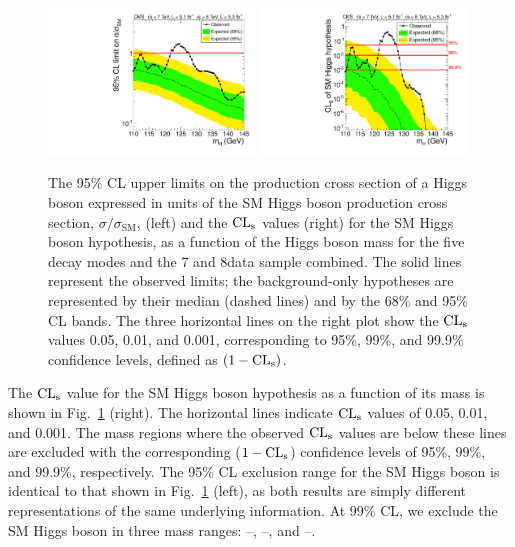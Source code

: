 \documentclass[12pt,twoside,a4paper,cmspaper,final,collab]{cms-tdr}
\begin{document}
\begin{figure} [b]
\centering
\includegraphics[width=0.49\textwidth]{figures/comb/sqr_acls_comb_HPA_smallGGScale} \hfill
\includegraphics[width=0.49\textwidth]{figures/comb/sqr_smacls_comb_HPA_smallGGScale}
\caption{ The 95\% CL upper limits on
the production cross section of a Higgs boson
expressed in units of the SM Higgs boson production cross section,
$\sigma / \sigma_\text{SM}$, (left)
and the $\mathrm{CL_s}$ values (right) for the SM Higgs boson hypothesis,
as a function of the Higgs boson mass for the five decay modes and the 7 and 8\TeV data sample combined.
The solid lines represent the observed limits;
the background-only hypotheses are represented by their median
(dashed lines) and by the 68\% and 95\% CL bands.
The three horizontal lines on the right plot show the $\mathrm{CL_s}$
values 0.05, 0.01, and 0.001,
corresponding to 95\%, 99\%, and 99.9\% confidence levels, defined as $(1-\mathrm{CL_s})$.
    }
\label{fig:CLsMu95}
\end{figure}


The $\mathrm{CL_s}$ value for the SM Higgs boson hypothesis as a function of its mass
is shown in Fig.~\ref{fig:CLsMu95} (right).
The horizontal lines indicate $\mathrm{CL_s}$ values of 0.05, 0.01, and 0.001.
The mass regions where the observed $\mathrm{CL_s}$ values are below these lines are excluded
with the corresponding ($1-\mathrm{CL_s}$) confidence levels of 95\%, 99\%, and 99.9\%, respectively.
The 95\% CL exclusion range for the SM Higgs boson is identical to that shown
in Fig.~\ref{fig:CLsMu95} (left), as both results
are simply different representations of the same underlying information.
At 99\% CL, we exclude the SM Higgs boson in three mass ranges:
\ObsOneNNL --\ObsOneNNH\GeV, \ObsTwoNNL --\ObsTwoNNH\GeV, and \ObsThreeNNL --\ObsThreeNNH\GeV.
\end{document}
